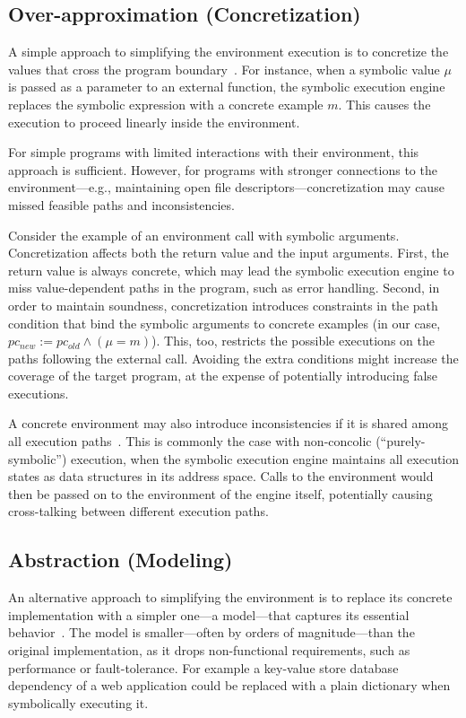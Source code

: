 \subsection{Over-approximation (Concretization)}

A simple approach to simplifying the environment execution is to concretize the values that cross the program boundary~\cite{dart,godefroid:fuzz,klee,exe}.
%
For instance, when a symbolic value $\mu$ is passed as a parameter to an external function, the symbolic execution engine replaces the symbolic expression with a concrete example $m$.  This causes the execution to proceed linearly inside the environment.

For simple programs with limited interactions with their environment, this approach is sufficient.  However, for programs with stronger connections to the environment---e.g., maintaining open file descriptors---concretization may cause missed feasible paths and inconsistencies.

Consider the example of an environment call with symbolic arguments.  Concretization affects both the return value and the input arguments.
%
First, the return value is always concrete, which may lead the symbolic execution engine to miss value-dependent paths in the program, such as error handling.
%
Second, in order to maintain soundness, concretization introduces constraints in the path condition that bind the symbolic arguments to concrete examples (in our case, $pc_{new} := pc_{old} \wedge (\mu = m)$).  This, too, restricts the possible executions on the paths following the external call.
%
Avoiding the extra conditions might increase the coverage of the target program, at the expense of potentially introducing false executions.

A concrete environment may also introduce inconsistencies if it is shared among all execution paths~\cite{klee}.
%
This is commonly the case with non-concolic (``purely-symbolic'') execution, when the symbolic execution engine maintains all execution states as data structures in its address space.  Calls to the environment would then be passed on to the environment of the engine itself, potentially causing cross-talking between different execution paths.

\subsection{Abstraction (Modeling)}

An alternative approach to simplifying the environment is to replace its concrete implementation with a simpler one---a model---that captures its essential behavior~\cite{klee,mayhem,aeg}.
%
The model is smaller---often by orders of magnitude---than the original implementation, as it drops non-functional requirements, such as performance or fault-tolerance.  For example a key-value store database dependency of a web application could be replaced with a plain dictionary when symbolically executing it.

